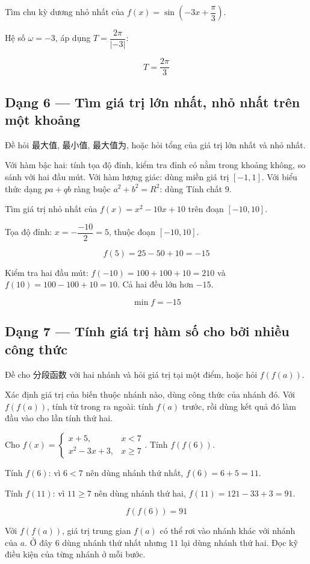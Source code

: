 \documentclass[11pt, a4paper]{article}
\begin{document}
\begin{vidu}[{8}]
Tìm chu kỳ dương nhỏ nhất của $f(x) = \sin\!\left(-3x + \dfrac{\pi}{3}\right)$.

Hệ số $\omega = -3$, áp dụng $T = \dfrac{2\pi}{|-3|}$:

$$T = \frac{2\pi}{3}$$

\end{vidu}
\subsection{Dạng 6 — Tìm giá trị lớn nhất, nhỏ nhất trên một khoảng}

 Đề hỏi 最大值, 最小值, 最大值为, hoặc hỏi tổng của giá trị lớn nhất và nhỏ nhất.

 Với hàm bậc hai: tính tọa độ đỉnh, kiểm tra đỉnh có nằm trong khoảng không, so sánh với hai đầu mút. Với hàm lượng giác: dùng miền giá trị $[-1,1]$. Với biểu thức dạng $pa + qb$ ràng buộc $a^2 + b^2 = R^2$: dùng Tính chất 9.

\begin{vidu}[{9}]
Tìm giá trị nhỏ nhất của $f(x) = x^2 - 10x + 10$ trên đoạn $[-10, 10]$.

Tọa độ đỉnh: $x = -\dfrac{-10}{2} = 5$, thuộc đoạn $[-10, 10]$.

$$f(5) = 25 - 50 + 10 = -15$$

Kiểm tra hai đầu mút: $f(-10) = 100 + 100 + 10 = 210$ và $f(10) = 100 - 100 + 10 = 10$. Cả hai đều lớn hơn $-15$.

$$\min f = -15$$

\end{vidu}
\subsection{Dạng 7 — Tính giá trị hàm số cho bởi nhiều công thức}

 Đề cho 分段函数 với hai nhánh và hỏi giá trị tại một điểm, hoặc hỏi $f(f(a))$.

 Xác định giá trị của biến thuộc nhánh nào, dùng công thức của nhánh đó. Với $f(f(a))$, tính từ trong ra ngoài: tính $f(a)$ trước, rồi dùng kết quả đó làm đầu vào cho lần tính thứ hai.

\begin{vidu}[{10}]
Cho $f(x) = \begin{cases} x + 5, & x < 7 \\ x^2 - 3x + 3, & x \ge 7 \end{cases}$. Tính $f(f(6))$.

Tính $f(6)$: vì $6 < 7$ nên dùng nhánh thứ nhất, $f(6) = 6 + 5 = 11$.

Tính $f(11)$: vì $11 \ge 7$ nên dùng nhánh thứ hai, $f(11) = 121 - 33 + 3 = 91$.

$$f(f(6)) = 91$$

 Với $f(f(a))$, giá trị trung gian $f(a)$ có thể rơi vào nhánh khác với nhánh của $a$. Ở đây $6$ dùng nhánh thứ nhất nhưng $11$ lại dùng nhánh thứ hai. Đọc kỹ điều kiện của từng nhánh ở mỗi bước.

\end{vidu}
\end{document}
